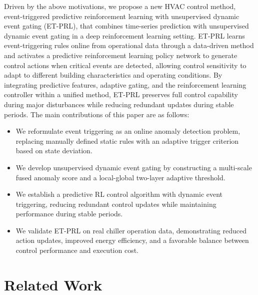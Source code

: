 \documentclass[preprint,12pt,number]{elsarticle}
\begin{document}
Driven by the above motivations, we propose a new HVAC control method, event-triggered predictive reinforcement learning with unsupervised dynamic event gating (ET-PRL), that combines time-series prediction with unsupervised dynamic event gating in a deep reinforcement learning setting. ET-PRL learns event-triggering rules online from operational data through a data-driven method and activates a predictive reinforcement learning policy network to generate control actions when critical events are detected, allowing control sensitivity to adapt to different building characteristics and operating conditions. By integrating predictive features, adaptive gating, and the reinforcement learning controller within a unified method, ET-PRL preserves full control capability during major disturbances while reducing redundant updates during stable periods. The main contributions of this paper are as follows:

\begin{itemize}
\item
  We reformulate event triggering as an online anomaly detection problem, replacing manually defined static rules with an adaptive trigger criterion based on state deviation.
\item
  We develop unsupervised dynamic event gating by constructing a multi-scale fused anomaly score and a local-global two-layer adaptive threshold.
\item
  We establish a predictive RL control algorithm with dynamic event triggering, reducing redundant control updates while maintaining performance during stable periods.
\item
  We validate ET-PRL on real chiller operation data, demonstrating reduced action updates, improved energy efficiency, and a favorable balance between control performance and execution cost.
\end{itemize}

\section{Related Work}\label{related-work}
\end{document}
